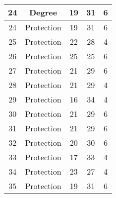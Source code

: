 \documentclass[results.tex]{subfiles}
\begin{document}
\begin{center}
\begin{tabular}{| c || c | c | c | c |}
            \hline
            24                      & Degree                       & 19                     & 31                      & 6                    \\
            \hline
            24                      & Protection                   & 19                     & 31                      & 6                    \\
            \hline
            25                      & Protection                   & 22                     & 28                      & 4                    \\
            \hline
            26                      & Protection                   & 25                     & 25                      & 6                    \\
            \hline
            27                      & Protection                   & 21                     & 29                      & 6                    \\
            \hline
            28                      & Protection                   & 21                     & 29                      & 4                    \\
            \hline
            29                      & Protection                   & 16                     & 34                      & 4                    \\
            \hline
            30                      & Protection                   & 21                     & 29                      & 6                    \\
            \hline
            31                      & Protection                   & 21                     & 29                      & 6                    \\
            \hline
            32                      & Protection                   & 20                     & 30                      & 6                    \\
            \hline
            33                      & Protection                   & 17                     & 33                      & 4                    \\
            \hline
            34                      & Protection                   & 23                     & 27                      & 4                    \\
            \hline
            35                      & Protection                   & 19                     & 31                      & 6                    \\

\end{tabular}
\end{center}
\end{document}
